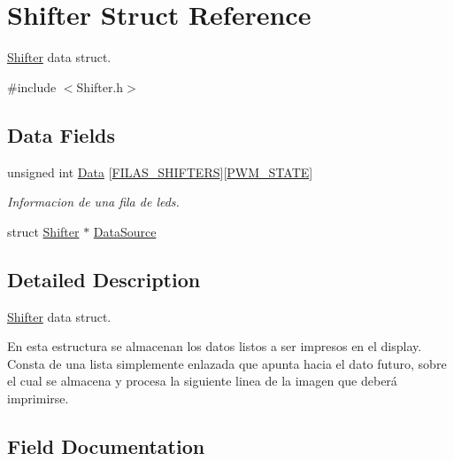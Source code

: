 \hypertarget{struct_shifter}{}\section{Shifter Struct Reference}
\label{struct_shifter}


\mbox{\hyperlink{struct_shifter}{Shifter}} data struct.  




{\ttfamily \#include $<$Shifter.\+h$>$}

\subsection*{Data Fields}
\begin{DoxyCompactItemize}
\item 
unsigned int \mbox{\hyperlink{struct_shifter_a815b5530bcfa9d222f76fd2033f47afa}{Data}} \mbox{[}\mbox{\hyperlink{_shifter_8h_a49e09f75d58a782c6d7f7e2def2611ae}{F\+I\+L\+A\+S\+\_\+\+S\+H\+I\+F\+T\+E\+RS}}\mbox{]}\mbox{[}\mbox{\hyperlink{_shifter_8h_a980e4269a1af42f44334612038718c32}{P\+W\+M\+\_\+\+S\+T\+A\+TE}}\mbox{]}
\begin{DoxyCompactList}\small\item\em Informacion de una fila de leds. \end{DoxyCompactList}\item 
struct \mbox{\hyperlink{struct_shifter}{Shifter}} $\ast$ \mbox{\hyperlink{struct_shifter_a7c2c0de3d2c63e31863ed44845d63ba8}{Data\+Source}}
\end{DoxyCompactItemize}


\subsection{Detailed Description}
\mbox{\hyperlink{struct_shifter}{Shifter}} data struct. 

En esta estructura se almacenan los datos listos a ser impresos en el display. Consta de una lista simplemente enlazada que apunta hacia el dato futuro, sobre el cual se almacena y procesa la siguiente linea de la imagen que deberá imprimirse. 

\subsection{Field Documentation}
\mbox{\label{struct_shifter_a815b5530bcfa9d222f76fd2033f47afa}} 
